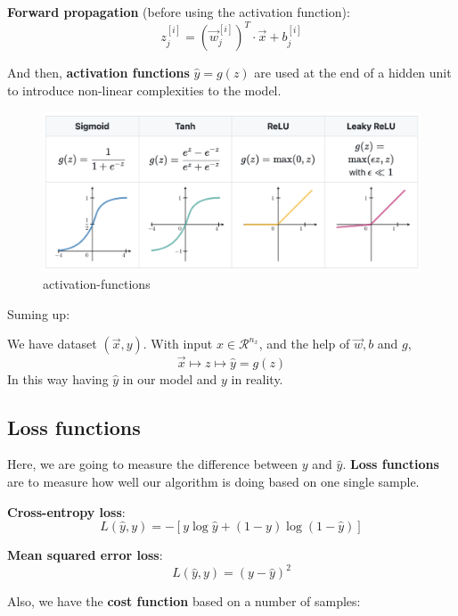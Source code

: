 \documentclass[11pt, a4paper]{article}
\begin{document}
\begin{tcolorbox}
    \textbf{Forward propagation} (before using the activation function):
   \[
       z_j^{[i]} = (\vec{w}_j^{[i]})^{T} \cdot \vec{x} + b_j^{[i]}
   \]
\end{tcolorbox}

And then, \textbf{activation functions} $\hat{y}=g(z)$ are used at the end of a hidden unit to introduce non-linear complexities to the model.

\begin{figure}[H] %
    \centering
    \includegraphics[width=\textwidth]{./fig/activation-functions.png}
    \caption{activation-functions}
    \label{fig:activation-functions}
\end{figure}

Suming up:

\begin{tcolorbox}
    We have dataset $(\vec{x},y)$. With input $x\in \mathcal{R}^{n_x}$, and the help of $\vec{w},b$ and $g$,
\[
    \vec{x} \mapsto z \mapsto \hat{y} = g(z)
\]
    In this way having $\hat{y}$ in our model and $y$ in reality.
\end{tcolorbox}
\subsection{Loss functions}
Here, we are going to measure the difference between $y$ and $\hat{y}$. \textbf{Loss functions} are to measure how well our algorithm is doing based on one single sample.
\begin{tcolorbox}
    \textbf{Cross-entropy loss}:
    \[
    L(\hat{y},y) = -[y\log \hat{y}+(1-y)\log (1-\hat{y})]
    \]
\end{tcolorbox}
\begin{tcolorbox}
    \textbf{Mean squared error loss}:
    \[
    L(\hat{y},y) = (y - \hat{y})^{2}
    \]
\end{tcolorbox}
Also, we have the \textbf{cost function} based on a number of samples:
\end{document}
